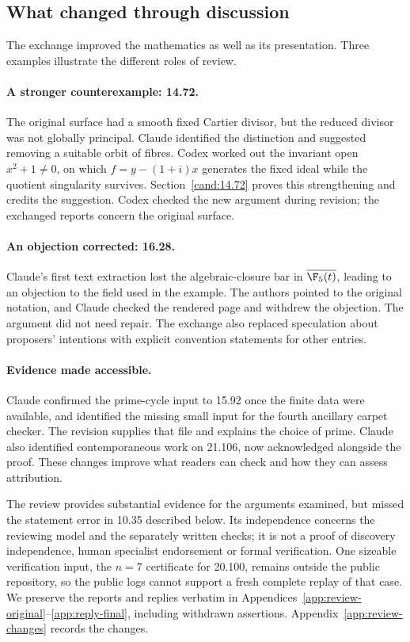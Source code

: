 \subsection{What changed through discussion}

The exchange improved the mathematics as well as its presentation.
Three examples illustrate the different roles of review.

\paragraph{A stronger counterexample: 14.72.}
The original surface had a smooth fixed Cartier divisor, but the reduced
divisor was not globally principal. Claude identified the distinction
and suggested removing a suitable orbit of fibres. Codex worked out
the invariant open \(x^2+1\ne0\), on which
\(f=y-(1+i)x\) generates the fixed ideal while the quotient singularity
survives. Section~\ref{cand:14.72} proves this strengthening and credits
the suggestion. Codex checked the new argument during revision; the exchanged reports
concern the original surface.

\paragraph{An objection corrected: 16.28.}
Claude's first text extraction lost the algebraic-closure bar in
\(\overline{\F_5(t)}\), leading to an objection to the field used in
the example. The authors pointed to the original notation, and Claude
checked the rendered page and withdrew the objection. The argument did
not need repair. The exchange also replaced speculation about proposers'
intentions with explicit convention statements for other entries.

\paragraph{Evidence made accessible.}
Claude confirmed the prime-cycle input to 15.92 once the finite data
were available, and identified the missing small input for the fourth
ancillary carpet checker. The revision supplies that file and explains
the choice of prime. Claude also identified contemporaneous work on
21.106, now acknowledged alongside the proof. These changes improve
what readers can check and how they can assess attribution.

The review provides substantial evidence for the arguments examined,
but missed the statement error in 10.35 described below.
Its independence concerns the reviewing model and the separately written
checks; it is not a proof of discovery independence, human specialist
endorsement or formal verification. One sizeable verification input,
the \(n=7\) certificate for 20.100, remains outside the public repository,
so the public logs cannot support a fresh complete replay of that case.
We preserve the reports and replies verbatim in
Appendices~\ref{app:review-original}--\ref{app:reply-final}, including
withdrawn assertions. Appendix~\ref{app:review-changes} records the changes.

